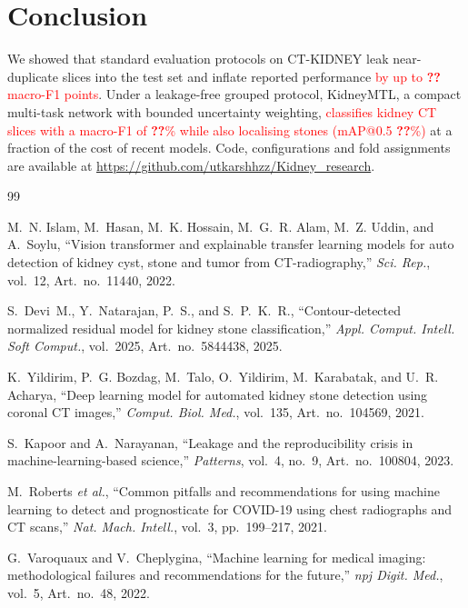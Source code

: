 \documentclass[conference]{IEEEtran}
\newcommand{\tbd}{\textcolor{red}{\textbf{??}}}            %
\newcommand{\finding}[1]{\textcolor{red}{#1}}             %
\begin{document}
\section{Conclusion}
We showed that standard evaluation protocols on CT-KIDNEY leak near-duplicate slices into the test set and
inflate reported performance \finding{by up to \tbd{} macro-F1 points}. Under a leakage-free grouped protocol,
KidneyMTL, a compact multi-task network with bounded uncertainty weighting, \finding{classifies kidney CT slices
with a macro-F1 of \tbd\% while also localising stones (mAP@0.5 \tbd\%)} at a fraction of the cost of recent
models. Code, configurations and fold assignments are available at
\url{https://github.com/utkarshhzz/Kidney_research}.

\begin{thebibliography}{99}
\footnotesize

M.~N. Islam, M.~Hasan, M.~K. Hossain, M.~G.~R. Alam, M.~Z. Uddin, and A.~Soylu, ``Vision transformer and
explainable transfer learning models for auto detection of kidney cyst, stone and tumor from CT-radiography,''
\emph{Sci. Rep.}, vol.~12, Art.~no.~11440, 2022.

S.~Devi~M., Y.~Natarajan, P.~S., and S.~P.~K.~R., ``Contour-detected normalized residual model for kidney stone
classification,'' \emph{Appl. Comput. Intell. Soft Comput.}, vol.~2025, Art.~no.~5844438, 2025.

K.~Yildirim, P.~G. Bozdag, M.~Talo, O.~Yildirim, M.~Karabatak, and U.~R. Acharya, ``Deep learning model for
automated kidney stone detection using coronal CT images,'' \emph{Comput. Biol. Med.}, vol.~135, Art.~no.~104569,
2021.

S.~Kapoor and A.~Narayanan, ``Leakage and the reproducibility crisis in machine-learning-based science,''
\emph{Patterns}, vol.~4, no.~9, Art.~no.~100804, 2023.

M.~Roberts \emph{et al.}, ``Common pitfalls and recommendations for using machine learning to detect and
prognosticate for COVID-19 using chest radiographs and CT scans,'' \emph{Nat. Mach. Intell.}, vol.~3,
pp.~199--217, 2021.

G.~Varoquaux and V.~Cheplygina, ``Machine learning for medical imaging: methodological failures and
recommendations for the future,'' \emph{npj Digit. Med.}, vol.~5, Art.~no.~48, 2022.


\end{thebibliography}
\end{document}
